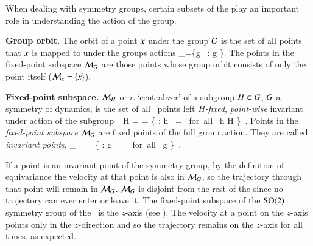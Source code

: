 
When dealing with symmetry groups, certain subsets of the {\statesp} play an important role in understanding the action of the group.

\begin{definition}
\label{def:grouporbit}
\textbf{Group orbit.}
The orbit of a point $x$ under the group $G$ is the set of all points that $x$ is mapped to under the groups actions
		\inCB
\beq
\pS_\ssp=\{{g} \, \ssp: g \in \Group\}.
The points in the fixed-point subspace ${\cal M}_{G}$ are those points whose group orbit consists of only the point itself (${\cal M}_{x}=\{x\}$).
\end{definition}

\begin{definition}
\label{def:centralizer}
\textbf{Fixed-point subspace.}
${\cal M}_H$ or a `centralizer' of a subgroup $H \subset G$,
$G$ a symmetry of dynamics, is the set of all \statesp\
points left \emph{$H$-fixed}, \emph{point-wise} invariant
under action of the subgroup
\beq
\pS_H =  =
   \{ \ssp \in \pS : {h} \, \ssp = \ssp \mbox{ for all } h \in H \}
\,.
Points in the \emph{fixed-point subspace}  ${\cal M}_{G}$ are fixed
points of the full group action. They are called \emph{invariant
points},
\beq
\pS_\Group = \Fix{\Group} =
   \{ \ssp \in \pS : {g} \, \ssp = \ssp \mbox{ for all } g \in \Group \}
\,.
\end{definition}
		                                                  \inCB

If a point is an invariant point of the symmetry group, by the definition of equivariance  the velocity at that point is also in ${\cal M}_{G}$, so the trajectory through that point will remain in ${\cal M}_{G}$. ${\cal M}_{G}$ is disjoint from the rest of the {\statesp} since no trajectory can ever enter or leave it. The fixed-point subspace of the $\textrm{SO}(2)$ symmetry group of the \cLe\ is the $z$-axis (see ). The velocity  at a point on the $z$-axis points only in the $z$-direction and so the trajectory remains on the $z$-axis for all times, as expected.

